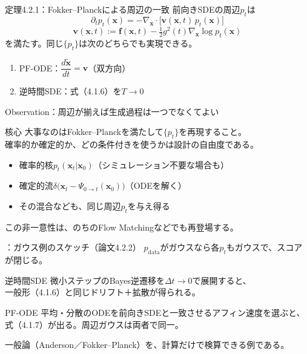 \asmain
\begin{frame}{定理4.2.1：Fokker--Planckによる周辺の一致}
    前向きSDEの周辺$p_t$は
    \[
        \partial_t p_t(\bm{x})
        =
        -\nabla_{\bm{x}}\cdot\bigl[\bm{v}(\bm{x},t)\,p_t(\bm{x})\bigr]
        \tag{4.2.1}
    \]
    \[
        \bm{v}(\bm{x},t)
        :=
        \bm{f}(\bm{x},t)
        -
        \tfrac12 g^{2}(t)\nabla_{\bm{x}}\log p_t(\bm{x})
    \]
    を満たす。同じ$\{p_t\}$は次のどちらでも実現できる。
    \begin{enumerate}
        \item PF-ODE：$\dfrac{d\tilde{\bm{x}}}{dt}=\bm{v}$（双方向）
        \item 逆時間SDE：式（4.1.6）を$T\to 0$
    \end{enumerate}
\end{frame}
\asmain
\begin{frame}{Observation：周辺が揃えば生成過程は一つでなくてよい}
    \begin{block}{核心}
        大事なのはFokker--Planckを満たして$\{p_t\}$を再現すること。\\
        確率的か確定的か、どの条件付きを使うかは設計の自由度である。
    \end{block}
    \begin{itemize}
        \item 確率的核$p_t(\bm{x}_t|\bm{x}_0)$（シミュレーション不要な場合も）
        \item 確定的流$\delta\bigl(\bm{x}_t-\Psi_{0\to t}(\bm{x}_0)\bigr)$（ODEを解く）
        \item その混合なども、同じ周辺$p_t$を与え得る
    \end{itemize}
    この非一意性は、のちのFlow Matchingなどでも再登場する。
\end{frame}
\assuppl
\begin{frame}{\supplmark：ガウス例のスケッチ（論文4.2.2）}
    $p_{\mathrm{data}}$がガウスなら各$p_t$もガウスで、スコアが閉じる。
    \begin{exampleblock}{逆時間SDE}
        微小ステップのBayes逆遷移を$\Delta t\to 0$で展開すると、\\
        一般形（4.1.6）と同じドリフト＋拡散が得られる。
    \end{exampleblock}
    \begin{exampleblock}{PF-ODE}
        平均・分散のODEを前向きSDEと一致させるアフィン速度を選ぶと、\\
        式（4.1.7）が出る。周辺ガウスは両者で同一。
    \end{exampleblock}
    \footnotesize
    一般論（Anderson／Fokker--Planck）を、計算だけで検算できる例である。
\end{frame}
